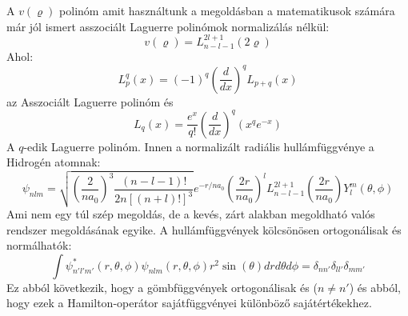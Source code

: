 \documentclass[a4paper,12pt]{article}
\begin{document}
A $v(\varrho)$ polinóm amit használtunk a megoldásban a matematikusok számára már jól ismert asszociált Laguerre polinómok normalizálás nélkül:
\begin{equation}
    v(\varrho) = L_{n - l - 1}^{2l + 1}(2\varrho)
\end{equation}
Ahol:
\begin{equation}
    L_p^q(x) = (-1)^q \left(\frac{d}{dx}\right)^q L_{p + q}(x)
\end{equation}
az Asszociált Laguerre polinóm és
\begin{equation}
    L_q(x) = \frac{e^x}{q!} \left(\frac{d}{dx}\right)^q (x^q e^{-x})
\end{equation}
A $q$-edik Laguerre polinóm. Innen a normalizált radiális hullámfüggvénye a Hidrogén atomnak:
\begin{equation}
    \psi_{n l m} = \sqrt{\left(\frac{2}{n a_0}\right)^3 \frac{(n - l - 1)!}{2 n [(n + l)!]^3}} e^{-r/na_0} \left(\frac{2r}{n a_0}\right)^l L_{n - l - 1}^{2l + 1} \left(\frac{2r}{n a_0}\right) Y_l^m(\theta, \phi)
\end{equation}
Ami nem egy túl szép megoldás, de a kevés, zárt alakban megoldható valós rendszer megoldásának egyike. A hullámfüggvények kölcsönösen ortogonálisak és normálhatók:
\begin{equation}
    \int \psi_{n' l' m'}^* (r, \theta, \phi) \psi_{n l m} (r, \theta, \phi) r^2 \sin(\theta) dr d\theta d\phi = \delta_{n n'} \delta_{l l'} \delta_{m m'}
\end{equation}
Ez abból következik, hogy a gömbfüggvények ortogonálisak és ($n \neq n'$) és abból, hogy ezek a Hamilton-operátor sajátfüggvényei különböző sajátértékekhez.
\end{document}
